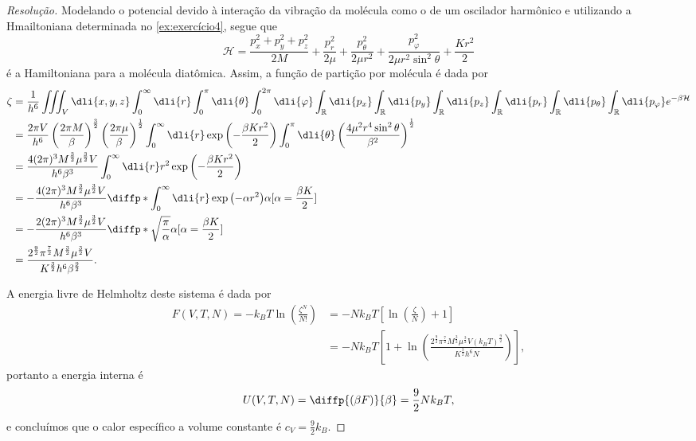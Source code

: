 \begin{proof}[Resolução]
    Modelando o potencial devido à interação da vibração da molécula como o de um oscilador harmônico e utilizando a Hmailtoniana determinada no \cref{ex:exercício4}, segue que
    \begin{equation*}
        \mathcal{H} = \frac{p_x^2 + p_y^2 + p_z^2}{2M} + \frac{p_r^2}{2\mu} + \frac{p_\theta^2}{2\mu r^2} + \frac{p_{\varphi}^2}{2\mu r^2 \sin^2\theta} + \frac{Kr^2}{2}
    \end{equation*}
    é a Hamiltoniana para a molécula diatômica. Assim, a função de partição por molécula é dada por
    \begin{align*}
        \zeta &= \frac{1}{h^6}\iiint_V \dli{x,y,z}\int_{0}^{\infty}\dli{r} \int_0^{\pi}\dli{\theta}\int_0^{2\pi} \dli{\varphi} \int_{\mathbb{R}}\dli{p_x}\int_{\mathbb{R}} \dli{p_y} \int_{\mathbb{R}}\dli{p_z}\int_{\mathbb{R}}\dli{p_r}\int_{\mathbb{R}}\dli{p_\theta} \int_{\mathbb{R}}\dli{p_{\varphi}} e^{-\beta \mathcal{H}}\\
              &= \frac{2\pi V}{h^6}\left(\frac{2\pi M}{\beta}\right)^{\frac32}\left(\frac{2\pi \mu}{\beta}\right)^{\frac12}\int_0^\infty \dli{r}\exp\left(-\frac{\beta K r^2}{2}\right)\int_0^{\pi}\dli{\theta} \left(\frac{4\mu^2r^4\sin^2\theta}{\beta^2}\right)^{\frac12}\\
              &= \frac{4(2\pi)^3M^{\frac32}\mu^{\frac32}V}{h^6\beta^3} \int_0^\infty \dli{r} r^2 \exp\left(-\frac{\beta K r^2}{2}\right)\\
              &= -\frac{4(2\pi)^3M^{\frac32}\mu^{\frac32}V}{h^6\beta^3} \diffp*{\int_0^\infty \dli{r} \exp\left(-\alpha r^2\right)}{\alpha}[\alpha = \frac{\beta K}{2}]\\
              &= -\frac{2(2\pi)^3M^{\frac32}\mu^{\frac32}V}{h^6\beta^3} \diffp*{\sqrt{\frac{\pi}{\alpha}}}{\alpha}[\alpha = \frac{\beta K}{2}]\\
              &= \frac{2^{\frac92}\pi^{\frac72}M^{\frac32}\mu^{\frac32}V}{K^{\frac32}h^6\beta^{\frac92}}.
    \end{align*}

    A energia livre de Helmholtz deste sistema é dada por
    \begin{align*}
        F(V, T, N) = -k_BT\ln\left(\frac{\zeta^N}{N!}\right)
        &= -Nk_BT \left[ \ln\left(\frac{\zeta}{N}\right) + 1\right]\\
        &= - N k_B T \left[1 + \ln\left(\frac{2^{\frac92}\pi^{\frac72}M^{\frac32}\mu^{\frac32}V(k_B T)^{\frac92}}{K^{\frac32}h^6 N}\right)\right],
    \end{align*}
    portanto a energia interna é
    \begin{equation*}
        U(V, T, N) = \diffp{(\beta F)}{\beta} = \frac92 Nk_B T,
    \end{equation*}
    e concluímos que o calor específico a volume constante é \(c_V = \frac92 k_B\).


\end{proof}
